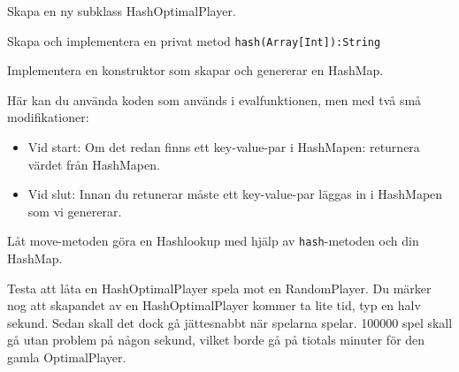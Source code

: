 \Subtask Skapa en ny subklass HashOptimalPlayer.

\Subtask Skapa och implementera en privat metod \texttt{hash(Array[Int]):String}

\Subtask Implementera en konstruktor som skapar och genererar en HashMap.

Här kan du använda koden som används i evalfunktionen, men med två små modifikationer:
\begin{itemize}
\item Vid start: Om det redan finns ett key-value-par i HashMapen: returnera värdet från HashMapen. 
\item Vid slut: Innan du retunerar måste ett key-value-par läggas in i HashMapen som vi genererar.
\end{itemize}
\Subtask Låt move-metoden göra en Hashlookup med hjälp av \texttt{hash}-metoden och din HashMap.

\Subtask Testa att låta en HashOptimalPlayer spela mot en RandomPlayer. Du märker nog att skapandet av en HashOptimalPlayer kommer ta lite tid, typ en halv sekund. Sedan skall det dock gå jättesnabbt när spelarna spelar. 100000 spel skall gå utan problem på någon sekund, vilket borde gå på tiotals minuter för den gamla OptimalPlayer.